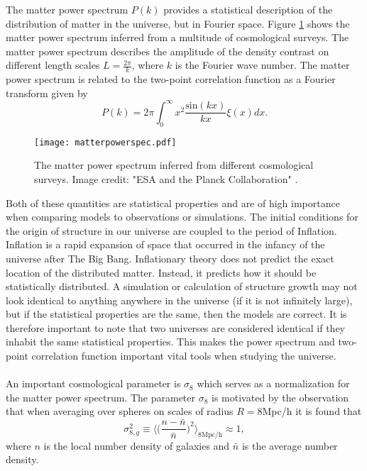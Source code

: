 The matter power spectrum $P(k)$ provides a statistical description of the
distribution of matter in the universe, but in Fourier space. Figure
\ref{fig:matterpowerspec} shows the matter power spectrum inferred from a multitude
of cosmological surveys. The matter power spectrum describes the amplitude of 
the density contrast on different length scales $L=\frac{2\pi}{k}$, where $k$ is
the Fourier wave number. The matter power spectrum is related to the two-point
correlation function as a Fourier transform given by
\begin{equation}
    P(k)=2\pi\int_0^\infty x^2\frac{\mathrm{sin}(kx)}{kx}\xi(x)dx.
\end{equation}
\begin{figure}[htbp]
    \texttt{[image: matterpowerspec.pdf]}
    \caption{The matter power spectrum inferred from different cosmological surveys. Image credit: "ESA and the Planck Collaboration" \cite{2020}.}
    \label{fig:matterpowerspec}
\end{figure}
Both of these quantities are statistical properties and are of high importance
when comparing models to observations or simulations. The initial conditions for 
the origin of structure in our universe are coupled to the period of Inflation. Inflation is a rapid expansion
of space that occurred in the infancy of the universe after The Big Bang.
Inflationary theory does not predict the exact location of the distributed matter.
Instead, it predicts how it should be statistically distributed.
A simulation or calculation of structure growth may
not look identical to anything anywhere in the universe (if it is not infinitely
large), but if the statistical properties are the same, then the models are
correct. It is therefore important to
note that two universes are considered identical if they inhabit the same
statistical properties. This makes the power spectrum and two-point correlation function
important vital tools when studying the universe.
\\\\\indent
An important cosmological parameter is $\sigma_8$ which serves as a normalization for the matter power spectrum. The parameter $\sigma_8$ is motivated by the observation that when averaging over spheres on scales of radius $R=8$Mpc/h it is found that
\begin{equation}
    \sigma_{8,g}^2\equiv\Big\langle\Big(\frac{n-\bar{n}}{\bar{n}}\Big)^2\Big\rangle_{8\mathrm{Mpc/h}}\approx1,
\end{equation}
where $n$ is the local number density of galaxies and $\bar{n}$ is the average number density.

